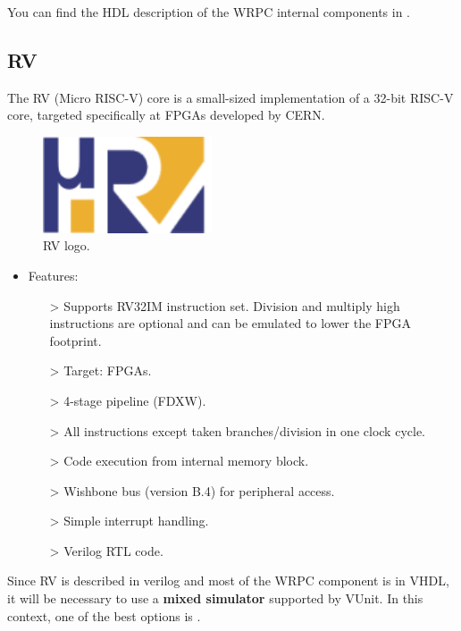 \noindent You can find the HDL description of the WRPC internal components in \cite{WRPC:modules}.

\subsection{\textmu RV}

The \textmu RV \cite{urv-core:ohwr} \cite{urv-core:wiki} \cite{Włostowski:2213516} (Micro RISC-V) core is a small-sized implementation of a 32-bit RISC-V core, targeted specifically at FPGAs developed by CERN. 

\begin{figure}[H]
    \centering
    \includegraphics[width=5cm]{figures/urv_logo.png}
    \caption{\textmu RV logo.}
    \label{fig:urv}
\end{figure}

\begin{itemize}
\item Features:
    \begin{itemize}
    \item[>] Supports RV32IM instruction set. 
Division and multiply high instructions are optional and can be emulated to lower the FPGA footprint.
    \item[>] Target: FPGAs.
    \item[>] 4-stage pipeline (FDXW).
    \item[>] All instructions except taken branches/division in one clock cycle.
    \item[>] Code execution from internal memory block.
    \item[>] Wishbone bus (version B.4) for peripheral access.
    \item[>] Simple interrupt handling.
    \item[>] Verilog RTL code.
    \end{itemize}
\end{itemize}

\noindent Since \textmu RV is described in verilog and most of the WRPC component is in VHDL, it will be necessary to use a \textbf{mixed simulator} supported by VUnit.
In this context, one of the best options is .

